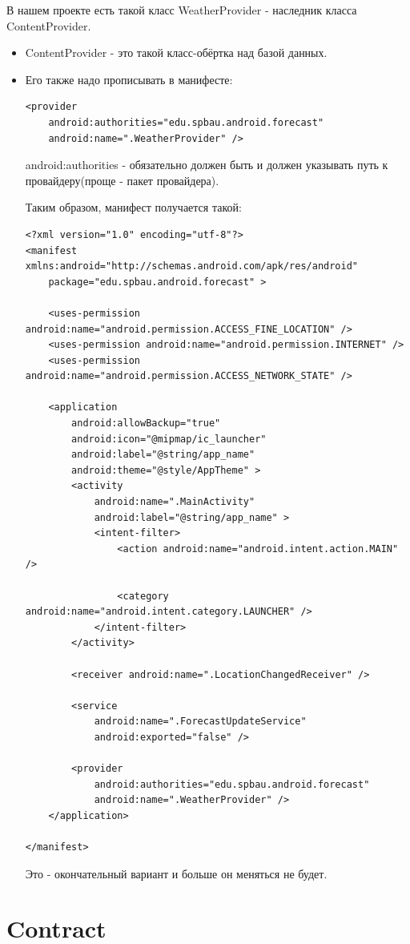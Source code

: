 \documentclass[12 pt]{article}
\begin{document}
    В нашем проекте есть такой класс WeatherProvider - наследник класса ContentProvider.
	\begin{itemize}
		\item ContentProvider - это такой класс-обёртка над базой данных.
		\item Его также надо прописывать в манифесте:
		\begin{lstlisting}
<provider
	android:authorities="edu.spbau.android.forecast"
    android:name=".WeatherProvider" />		
		\end{lstlisting}
		android:authorities - обязательно должен быть и должен указывать путь к провайдеру(проще - пакет провайдера).
		
		Таким образом, манифест получается такой:
		\begin{lstlisting}
<?xml version="1.0" encoding="utf-8"?>
<manifest xmlns:android="http://schemas.android.com/apk/res/android"
    package="edu.spbau.android.forecast" >

    <uses-permission android:name="android.permission.ACCESS_FINE_LOCATION" />
    <uses-permission android:name="android.permission.INTERNET" />
    <uses-permission android:name="android.permission.ACCESS_NETWORK_STATE" />

    <application
        android:allowBackup="true"
        android:icon="@mipmap/ic_launcher"
        android:label="@string/app_name"
        android:theme="@style/AppTheme" >
        <activity
            android:name=".MainActivity"
            android:label="@string/app_name" >
            <intent-filter>
                <action android:name="android.intent.action.MAIN" />

                <category android:name="android.intent.category.LAUNCHER" />
            </intent-filter>
        </activity>

        <receiver android:name=".LocationChangedReceiver" />

        <service
            android:name=".ForecastUpdateService"
            android:exported="false" />
        
        <provider
            android:authorities="edu.spbau.android.forecast"
            android:name=".WeatherProvider" />
    </application>

</manifest>		
		\end{lstlisting}
		
		Это - окончательный вариант и больше он меняться не будет.
	\end{itemize}    
	
\section{Contract}
	
\end{document}
